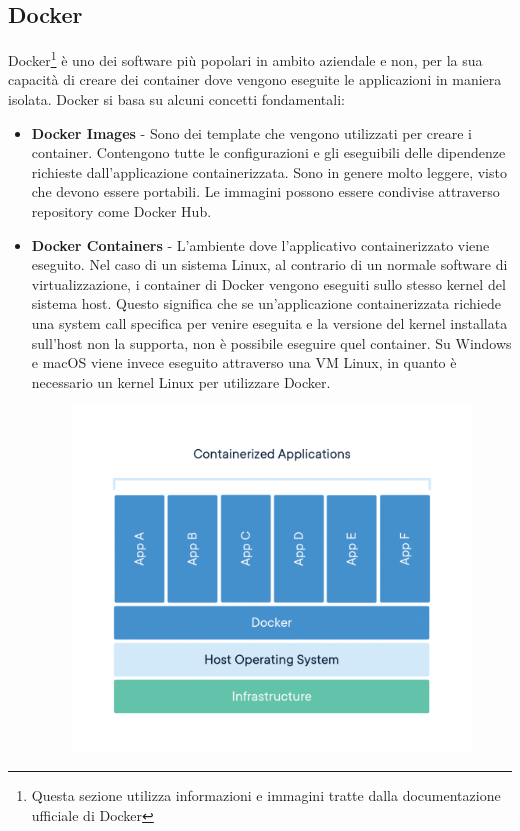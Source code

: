 \subsection{Docker}
Docker\footnote{Questa sezione utilizza informazioni e immagini tratte dalla documentazione ufficiale di Docker\cite{dockerdocs}}
\`e uno dei software pi\`u popolari in ambito aziendale e non, per la sua capacit\`a di creare dei container dove vengono eseguite le applicazioni in maniera isolata.
Docker si basa su alcuni concetti fondamentali:
\begin{itemize}
  \item \textbf{Docker Images} - Sono dei template che vengono utilizzati per creare i container. Contengono tutte le configurazioni e gli eseguibili delle dipendenze richieste
    dall'applicazione containerizzata. Sono in genere molto leggere, visto che devono essere portabili. Le immagini possono essere condivise attraverso repository come Docker Hub.
  \item \textbf{Docker Containers} - L'ambiente dove l'applicativo containerizzato viene eseguito. Nel caso di un sistema Linux, al contrario di un normale software di virtualizzazione,
    i container di Docker vengono eseguiti sullo stesso kernel del sistema host. Questo significa che se un'applicazione containerizzata richiede una system call specifica
    per venire eseguita e la versione del kernel installata sull'host non la supporta, non \`e possibile eseguire quel container. Su Windows e macOS viene invece eseguito
    attraverso una VM Linux, in quanto \`e necessario un kernel Linux per utilizzare Docker.
    \begin{figure}[H]
      \centering
      \includegraphics[width=11cm]{images/docker.png}

\end{figure}
\end{itemize}
